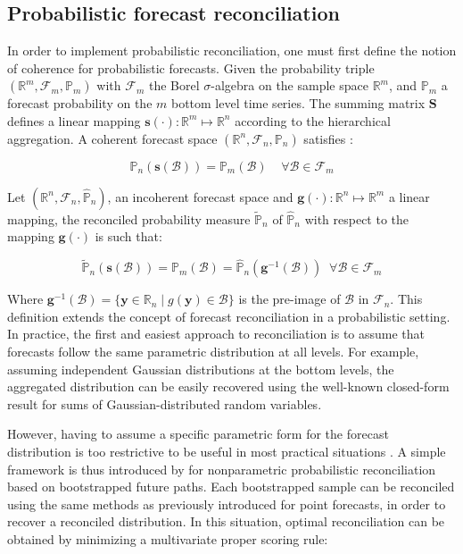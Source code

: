 \documentclass[letterpaper]{article}
\begin{document}
\subsection{Probabilistic forecast reconciliation}\label{prob_rec}

In order to implement probabilistic reconciliation, one must first define the notion of coherence for probabilistic forecasts. 
Given the probability triple $(\mathbb{R}^m, \mathcal{F}_m, \mathbb{P}_m)$ with $\mathcal{F}_m$ the Borel $\sigma$-algebra on the sample space $\mathbb{R}^m$, and $\mathbb{P}_m$ a forecast probability on the $m$ bottom level time series. 
The summing matrix $\mathbf{S}$ defines a linear mapping $\mathbf{s}(\cdot) : \mathbb{R}^m  \mapsto \mathbb{R}^n$ according to the hierarchical aggregation.
A coherent forecast space $(\mathbb{R}^n, \mathcal{F}_n,\mathbb{P}_n)$ satisfies :

\begin{equation}
    \mathbb{P}_n(\mathbf{s}(\mathcal{B})) = \mathbb{P}_m(\mathcal{B}) \;\;\;\; \forall \mathcal{B}\in \mathcal{F}_m
\end{equation}

Let $(\mathbb{R}^n, \mathcal{F}_n,\hat{\mathbb{P}}_n)$, an incoherent forecast space and $\mathbf{g}(\cdot) : \mathbb{R}^n  \mapsto \mathbb{R}^m $ a linear mapping, the reconciled probability measure $\tilde{\mathbb{P}}_n$ of $\hat{\mathbb{P}}_n$ with respect to the mapping $\mathbf{g}(\cdot)$ is such that:

\begin{equation}
   \tilde{\mathbb{P}}_n(\mathbf{s} (\mathcal{B})) = \mathbb{P}_m(\mathcal{B}) = \hat{\mathbb{P}}_n(\mathbf{g}^{-1}\left ( \mathcal{B}\right )) \;\; \forall \mathcal{B}\in \mathcal{F}_m
\end{equation}

Where $ \mathbf{g}^{-1} (\mathcal{B}) = \{ \mathbf{y} \in \mathbb{R}_n \; | \; g(\mathbf{y}) \in \mathcal{B} \} $ is the pre-image of $\mathcal{B}$ in $\mathcal{F}_n$. 
This definition extends the concept of forecast reconciliation in a probabilistic setting. 
In practice, the first and easiest approach to reconciliation is to assume that forecasts follow the same parametric distribution at all levels. 
For example, assuming independent Gaussian distributions at the bottom levels, the aggregated distribution can be easily recovered using the well-known closed-form result for sums of Gaussian-distributed random variables. 

However, having to assume a specific parametric form for the forecast distribution is too restrictive to be useful in most practical situations \cite{ANR_book}.
A simple framework is thus introduced by \cite{probreconciliation}  for nonparametric probabilistic reconciliation based on bootstrapped future paths. 
Each bootstrapped sample can be reconciled using the same methods as previously introduced for point forecasts, in order to recover a reconciled distribution.
In this situation, optimal reconciliation can be obtained by minimizing a multivariate proper scoring rule:
\end{document}
